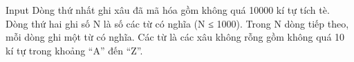 Input
Dòng thứ nhất ghi xâu đã mã hóa gồm không quá 10000 kí tự tích tè. Dòng thứ hai ghi số N là số các từ có nghĩa (N ≤ 1000). Trong N dòng tiếp theo, mỗi dòng ghi một từ có nghĩa. Các từ là các xâu không rỗng gồm không quá 10 kí tự trong khoảng “A” đến “Z”.